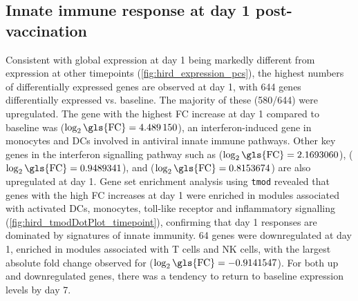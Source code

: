 \subsection{Innate immune response at day 1 post-vaccination}

Consistent with global expression at day 1 being markedly different from expression at other timepoints (\cref{fig:hird_expression_pcs}), the highest numbers of differentially expressed genes are observed at day 1, with 644 genes differentially expressed vs. baseline.
The majority of these (580/644) were upregulated.
The gene with the highest \gls{FC} increase at day 1 compared to baseline was  ($\log_2\text{\gls{FC}} = \num{4.489150}$), an interferon-induced gene in monocytes and \glspl{DC} involved in antiviral innate immune pathways\autocite{bin2016AnkyrinRepeatDomain}.
Other key genes in the interferon signalling pathway\autocite{schneider2014InterferonStimulatedGenesComplex} such as  ($\log_2\text{\gls{FC}} = 2.1693060$),    ($\log_2\text{\gls{FC}} = 0.9489341$), and  ($\log_2\text{\gls{FC}} = 0.8153674$) are also upregulated at day 1.
Gene set enrichment analysis using \texttt{tmod} revealed that genes with the high \gls{FC} increases at day 1 were enriched in modules associated with activated \glspl{DC}, monocytes, toll-like receptor and inflammatory signalling (\cref{fig:hird_tmodDotPlot_timepoint}), confirming that day 1 responses are dominated by signatures of innate immunity.
64 genes were downregulated at day 1, enriched in modules associated with T cells and \gls{NK} cells, with the largest absolute fold change observed for  ($\log_2\text{\gls{FC}} = -0.9141547$).
For both up and downregulated genes, there was a tendency to return to baseline expression levels by day 7.

